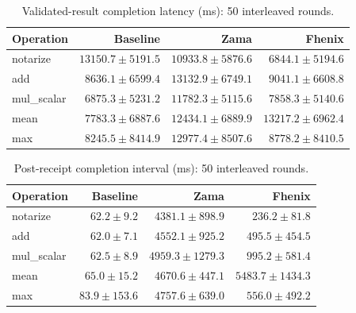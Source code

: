 \begin{table}[!t]
\centering\small
\caption{Validated-result completion latency (ms): 50 interleaved rounds.}
\label{tab:lifecycle-transactionToValidatedPlaintextMs}
\begin{tabular}{lrrr}
\hline
Operation & Baseline & Zama & Fhenix \\
\hline
notarize & \(13150.7 \pm 5191.5\) & \(10933.8 \pm 5876.6\) & \(6844.1 \pm 5194.6\) \\
add & \(8636.1 \pm 6599.4\) & \(13132.9 \pm 6749.1\) & \(9041.1 \pm 6608.8\) \\
mul\_scalar & \(6875.3 \pm 5231.2\) & \(11782.3 \pm 5115.6\) & \(7858.3 \pm 5140.6\) \\
mean & \(7783.3 \pm 6887.6\) & \(12434.1 \pm 6889.9\) & \(13217.2 \pm 6962.4\) \\
max & \(8245.5 \pm 8414.9\) & \(12977.4 \pm 8507.6\) & \(8778.2 \pm 8410.5\) \\
\hline
\end{tabular}
\end{table}

\begin{table}[!t]
\centering\small
\caption{Post-receipt completion interval (ms): 50 interleaved rounds.}
\label{tab:lifecycle-postReceiptToValidatedPlaintextMs}
\begin{tabular}{lrrr}
\hline
Operation & Baseline & Zama & Fhenix \\
\hline
notarize & \(62.2 \pm 9.2\) & \(4381.1 \pm 898.9\) & \(236.2 \pm 81.8\) \\
add & \(62.0 \pm 7.1\) & \(4552.1 \pm 925.2\) & \(495.5 \pm 454.5\) \\
mul\_scalar & \(62.5 \pm 8.9\) & \(4959.3 \pm 1279.3\) & \(995.2 \pm 581.4\) \\
mean & \(65.0 \pm 15.2\) & \(4670.6 \pm 447.1\) & \(5483.7 \pm 1434.3\) \\
max & \(83.9 \pm 153.6\) & \(4757.6 \pm 639.0\) & \(556.0 \pm 492.2\) \\
\hline
\end{tabular}
\end{table}

